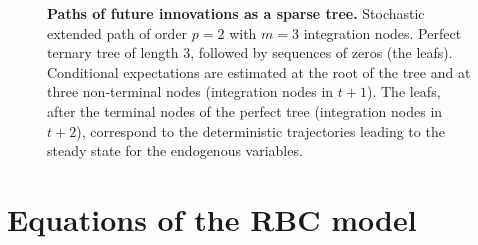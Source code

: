\documentclass[a4paper,12pt]{amsart}
\begin{document}
 \begin{figure}[H]
   \label{sep:sparse-tree}
   \centering
   {\tiny
      }
   \bigskip\bigskip
   \caption{\textbf{Paths of  future innovations as a sparse tree.} Stochastic extended path of order $p=2$ with $m=3$ integration nodes. Perfect ternary tree of length 3, followed by sequences of zeros (the leafs). Conditional expectations are estimated at the root of the tree and at three non-terminal nodes (integration nodes in $t+1$). The leafs, after the terminal nodes of the perfect tree (integration nodes in $t+2$), correspond to the deterministic trajectories leading to the steady state for the endogenous variables.}
\end{figure}

\newpage

\setcounter{equation}{0}
\renewcommand{\theequation}{\thesection.\arabic{equation}}


\section{Equations of the RBC model}\label{appendix:rbc}
\setcounter{equation}{0}
\end{document}
